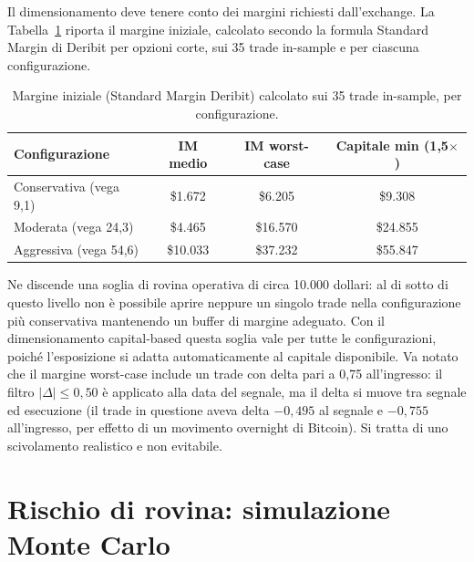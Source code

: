 Il dimensionamento deve tenere conto dei margini richiesti dall'exchange. La
Tabella~\ref{tab:margini} riporta il margine iniziale, calcolato secondo la
formula Standard Margin di Deribit per opzioni corte, sui 35 trade
in-sample e per ciascuna configurazione.

\begin{table}[H]
\centering
\caption{Margine iniziale (Standard Margin Deribit) calcolato sui 35 trade
in-sample, per configurazione.}
\label{tab:margini}
\begin{tabular}{lccc}
\toprule
\textbf{Configurazione} & \textbf{IM medio} & \textbf{IM worst-case} & \textbf{Capitale min (1,5$\times$)} \\
\midrule
Conservativa (vega 9,1)  & \$1.672  & \$6.205  & \$9.308 \\
Moderata (vega 24,3)     & \$4.465  & \$16.570 & \$24.855 \\
Aggressiva (vega 54,6)   & \$10.033 & \$37.232 & \$55.847 \\
\bottomrule
\end{tabular}
\end{table}

Ne discende una soglia di rovina operativa di circa 10.000 dollari: al di
sotto di questo livello non è possibile aprire neppure un singolo trade
nella configurazione più conservativa mantenendo un buffer di margine
adeguato. Con il dimensionamento capital-based questa soglia vale per tutte
le configurazioni, poiché l'esposizione si adatta automaticamente al
capitale disponibile. Va notato che il margine worst-case include un trade
con delta pari a 0,75 all'ingresso: il filtro $|\Delta| \le 0{,}50$ è
applicato alla data del segnale, ma il delta si muove tra segnale ed
esecuzione (il trade in questione aveva delta $-0{,}495$ al segnale e
$-0{,}755$ all'ingresso, per effetto di un movimento overnight di Bitcoin).
Si tratta di uno scivolamento realistico e non evitabile.

\section{Rischio di rovina: simulazione Monte Carlo}
\label{sec:mm-montecarlo}

